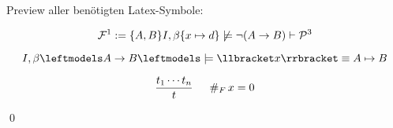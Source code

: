 

\date{Donnerstag 07.11.2019}


\maketitle


Preview aller benötigten Latex-Symbole:

$$ \mathcal{F}^{1} := \{ A, B\}  I, \beta \{x \mapsto d\} \not\models \lnot(A \to B) \vdash \mathcal{P}^{3} $$

$$ \Ib \lmodels A \to B\bimodels \llbracket x \rrbracket \equiv A \mapsto B$$


$$ \frac{t_1\cdots t_n}{t} \,\,\,\,\,\,\,\,\,  \#_{F}\, x = 0 $$

\qed


